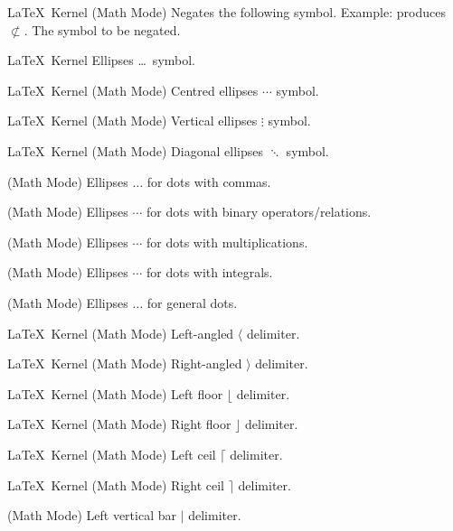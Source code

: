 %
 {}%
 {\LaTeX\ Kernel (Math Mode)}%
 {Negates the following symbol. Example:  produces
   \ensuremath{\not\subset}.}%
 {%
   \BeginArgList
     The symbol to be negated.
   \EndArgList
 }

%
 {}%
 {\LaTeX\ Kernel}%
 {Ellipses \ldots\ symbol.}%
 {}

%
 {}%
 {\LaTeX\ Kernel (Math Mode)}%
 {Centred ellipses \ensuremath{\cdots} symbol.}%
 {}

%
 {}%
 {\LaTeX\ Kernel (Math Mode)}%
 {Vertical ellipses \ensuremath{\vdots} symbol.}%
 {}

%
 {}%
 {\LaTeX\ Kernel (Math Mode)}%
 {Diagonal ellipses \ensuremath{\ddots} symbol.}%
 {}

%
 {}%
 { (Math Mode)}%
 {Ellipses \ensuremath{\dotsc} for dots with commas.}%
 {}

%
 {}%
 { (Math Mode)}%
 {Ellipses \ensuremath{\dotsb} for dots with binary
  operators\slash relations.}%
 {}

%
 {}%
 { (Math Mode)}%
 {Ellipses \ensuremath{\dotsm} for dots with multiplications.}%
 {}

%
 {}%
 { (Math Mode)}%
 {Ellipses \ensuremath{\dotsi} for dots with integrals.}%
 {}

%
 {}%
 { (Math Mode)}%
 {Ellipses \ensuremath{\dotso} for general dots.}%
 {}

%
 {}%
 {\LaTeX\ Kernel (Math Mode)}%
 {Left-angled \ensuremath{\langle} delimiter.}%
 {}

%
 {}%
 {\LaTeX\ Kernel (Math Mode)}%
 {Right-angled \ensuremath{\rangle} delimiter.}%
 {}

%
 {}%
 {\LaTeX\ Kernel (Math Mode)}%
 {Left floor \ensuremath{\lfloor} delimiter.}%
 {}

%
 {}%
 {\LaTeX\ Kernel (Math Mode)}%
 {Right floor \ensuremath{\rfloor} delimiter.}%
 {}

%
 {}%
 {\LaTeX\ Kernel (Math Mode)}%
 {Left ceil \ensuremath{\lceil} delimiter.}%
 {}

%
 {}%
 {\LaTeX\ Kernel (Math Mode)}%
 {Right ceil \ensuremath{\rceil} delimiter.}%
 {}

%
 {}%
 { (Math Mode)}%
 {Left vertical bar \ensuremath{\lvert} delimiter.}%
 {}

